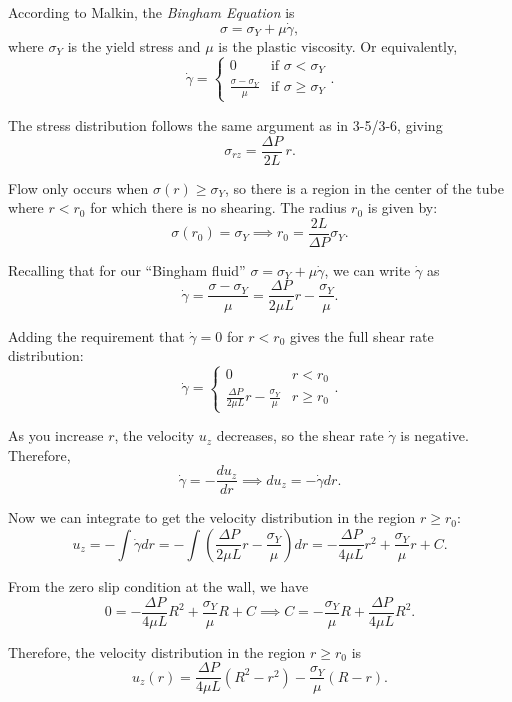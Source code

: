 \documentclass[12pt, a4paper]{article}
\numberwithin{equation}{section}
\begin{document}
According to Malkin, the \textit{Bingham Equation} is
\begin{equation}
	\sigma = \sigma_Y + \mu \dot\gamma,
	\label{eq:bingham}
\end{equation}
where $\sigma_Y$ is the yield stress and $\mu$ is the plastic viscosity.
Or equivalently,
\[
	\dot\gamma = \begin{cases}
		0 & \text{if } \sigma < \sigma_Y \\
		\frac{\sigma - \sigma_Y}{\mu} & \text{if } \sigma \geq \sigma_Y
	\end{cases}.
\]

The stress distribution follows the same argument as in 3-5/3-6, giving
\[
    \sigma_{rz} = \frac{\Delta P}{2L}\, r.
\]

Flow only occurs when $\sigma(r) \geq \sigma_Y$, so there is a region in the center of the tube where $r < r_0$ for which there is no shearing.
The radius $r_0$ is given by:
\[
	\sigma(r_0) = \sigma_Y \implies r_0 = \frac{2L}{\Delta P}\sigma_Y.
\]

Recalling that for our ``Bingham fluid'' $\sigma = \sigma_Y + \mu \dot\gamma$, we can write $\dot\gamma$ as
\[
	\dot\gamma = \frac{\sigma - \sigma_Y}{\mu}
	= \frac{\Delta P}{2\mu L}r - \frac{\sigma_Y}{\mu}.
\]

Adding the requirement that $\dot\gamma = 0$ for $r < r_0$ gives the full shear rate distribution:
\[
	\boxed{\dot\gamma = \begin{cases}
		0 & r < r_0 \\
		\frac{\Delta P}{2\mu L}r - \frac{\sigma_Y}{\mu} & r \geq r_0
	\end{cases}}.
\]

As you increase $r$, the velocity $u_z$ decreases, so the shear rate $\dot\gamma$ is negative. Therefore,
\[
	\dot\gamma  = - \frac{du_z}{dr} \implies du_z = -\dot\gamma dr.
\]

Now we can integrate to get the velocity distribution in the region $r \geq r_0$:
\[
	u_z = -\int \dot\gamma dr
		= -\int \left(\frac{\Delta P}{2\mu L}r - \frac{\sigma_Y}{\mu}\right) dr
		= -\frac{\Delta P}{4\mu L}r^2 + \frac{\sigma_Y}{\mu}r + C.
\]

From the zero slip condition at the wall, we have
\[
	0 = -\frac{\Delta P}{4\mu L}R^2 + \frac{\sigma_Y}{\mu}R + C
	\implies C = - \frac{\sigma_Y}{\mu}R + \frac{\Delta P}{4\mu L}R^2.
\]

Therefore, the velocity distribution in the region $r \geq r_0$ is
\[
	u_z(r) = \frac{\Delta P}{4\mu L}(R^2 - r^2) - \frac{\sigma_Y}{\mu}(R - r).
\]
\end{document}
